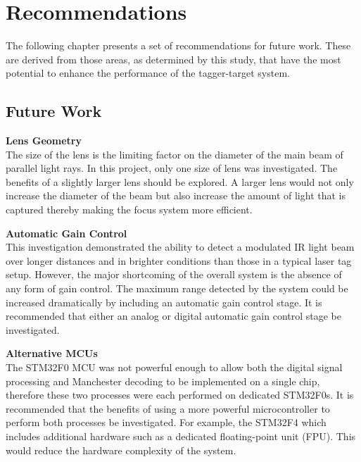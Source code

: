 \chapter{Recommendations}
\label{ch_recommendations}



The following chapter presents a set of recommendations for future work. These are derived from those areas, as determined by this study, that have the most potential to enhance the performance of the tagger-target system.

\section{Future Work}

\textbf{Lens Geometry}\\
The size of the lens is the limiting factor on the diameter of the main beam of parallel light rays. In this project, only one size of lens was investigated. The benefits of a slightly larger lens should be explored. A larger lens would not only increase the diameter of the beam but also increase the amount of light that is captured thereby making the focus system more efficient.

\textbf{Automatic Gain Control}\\
This investigation demonstrated the ability to detect a modulated IR light beam over longer distances and in brighter conditions than those in a typical laser tag setup. However, the major shortcoming of the overall system is the absence of any form of gain control. The maximum range detected by the system could be increased dramatically by including an automatic gain control stage. It is recommended that either an analog or digital automatic gain control stage be investigated.

\textbf{Alternative MCUs}\\
The STM32F0 MCU was not powerful enough to allow both the digital signal processing and Manchester decoding to be implemented on a single chip, therefore these two processes were each performed on dedicated STM32F0s. It is recommended that the benefits of using a more powerful microcontroller to perform both processes be investigated. For example, the STM32F4 which includes additional hardware such as a dedicated floating-point unit (FPU). This would reduce the hardware complexity of the system.

